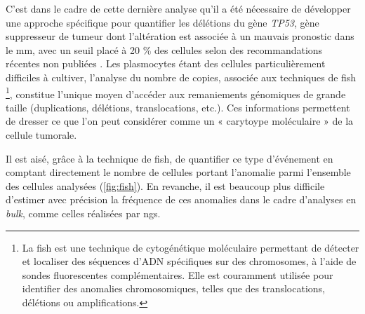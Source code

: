 \vspace{1em}

C'est dans le cadre de cette dernière analyse qu'il a été nécessaire de développer une approche spécifique pour quantifier les délétions du gène \textit{TP53}, 
gène suppresseur de tumeur dont l'altération est associée à un mauvais pronostic dans le \gls{mm}, avec un seuil placé à 20 \% des cellules selon des recommandations 
récentes non publiées \cite{flyntPrognosisBiologyTargeting2020}.
Les plasmocytes étant des cellules particulièrement difficiles à cultiver, l'analyse du nombre de copies, associée aux techniques de \gls{fish} 
\footnote{La \gls{fish} est une technique de cytogénétique moléculaire permettant de détecter et localiser des séquences d'ADN spécifiques sur des chromosomes, à l'aide de sondes fluorescentes complémentaires. 
Elle est couramment utilisée pour identifier des anomalies chromosomiques, telles que des translocations, délétions ou amplifications.}, constitue l'unique 
moyen d'accéder aux remaniements génomiques de grande taille (duplications, délétions, translocations, etc.).
Ces informations permettent de dresser ce que l'on peut considérer comme un « carytoype moléculaire » de la cellule tumorale. 

\vspace{1em}

Il est aisé, grâce à la technique de \gls{fish}, de quantifier ce type d'événement en comptant directement le nombre de cellules portant l'anomalie parmi l'ensemble des cellules analysées 
(\autoref{fig:fish}).  
En revanche, il est beaucoup plus difficile d'estimer avec précision la fréquence de ces anomalies dans le cadre d'analyses en \textit{bulk}, comme celles réalisées par \gls{ngs}.

